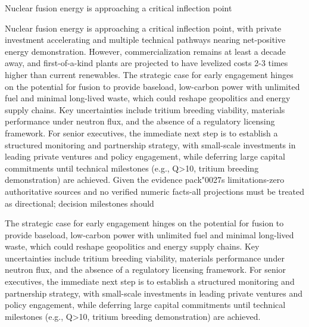 \documentclass[10pt,a4paper]{article}
\newcommand{\BOApos}{{\BOQuoteFont\char"0027}}
\begin{document}
\begin{minipage}[t]{0.44\linewidth}
{\sffamily\fontsize{17}{23}\selectfont\color{BOGreen} Nuclear fusion energy is approaching a critical inflection point}\par\vspace{10pt}
{\small\color{BOText} Nuclear fusion energy is approaching a critical inflection point, with private investment accelerating and multiple technical pathways nearing net-positive energy demonstration. However, commercialization remains at least a decade away, and first-of-a-kind plants are projected to have levelized costs 2-3 times higher than current renewables. The strategic case for early engagement hinges on the potential for fusion to provide baseload, low-carbon power with unlimited fuel and minimal long-lived waste, which could reshape geopolitics and energy supply chains. Key uncertainties include tritium breeding viability, materials performance under neutron flux, and the absence of a regulatory licensing framework. For senior executives, the immediate next step is to establish a structured monitoring and partnership strategy, with small-scale investments in leading private ventures and policy engagement, while deferring large capital commitments until technical milestones (e.g., Q>10, tritium breeding demonstration) are achieved. Given the evidence pack\BOApos{}s limitations-zero authoritative sources and no verified numeric facts-all projections must be treated as directional; decision milestones should}\par
\end{minipage}\hfill\begin{minipage}[t]{0.45\linewidth}
{\small\color{BOText} The strategic case for early engagement hinges on the potential for fusion to provide baseload, low-carbon power with unlimited fuel and minimal long-lived waste, which could reshape geopolitics and energy supply chains. Key uncertainties include tritium breeding viability, materials performance under neutron flux, and the absence of a regulatory licensing framework. For senior executives, the immediate next step is to establish a structured monitoring and partnership strategy, with small-scale investments in leading private ventures and policy engagement, while deferring large capital commitments until technical milestones (e.g., Q>10, tritium breeding demonstration) are achieved.}\par
\end{minipage}
\end{document}
